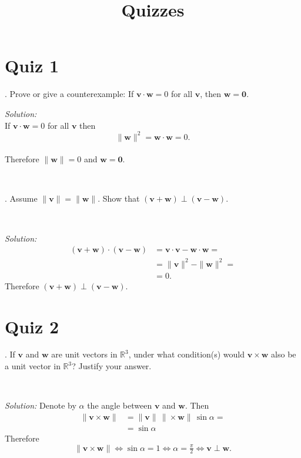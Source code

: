 \documentclass{article}
\def\RR{\mathbb{R}}%
\begin{document}
\title{Quizzes}
\author{}
\date{}
\maketitle

\section*{
Quiz 1
}

. Prove or give a counterexample: 
If $\mathbf{v}\cdot\mathbf{w} = 0$ for all $\mathbf{v}$, then
  $\mathbf{w} =\mathbf{0}$.
  
\noindent
\textit{Solution:}\\
If $\mathbf{v}\cdot\mathbf{w} = 0$ for all $\mathbf{v}$ then 
$$\|\mathbf{w}\|^2=\mathbf{w}\cdot\mathbf{w} = 0.$$\\ 
Therefore $\|\mathbf{w}\| = 0$ and $\mathbf{w}=\mathbf{0}$.

\ 

.
Assume $\|\mathbf{v}\|=\|\mathbf{w}\|$. 
Show that $(\mathbf{v}+\mathbf{w})\perp(\mathbf{v}-\mathbf{w})$.

\ 

\noindent
\textit{Solution:}\\
\begin{align*}
(\mathbf{v}+\mathbf{w})\cdot(\mathbf{v}-\mathbf{w})
&=\mathbf{v}\cdot\mathbf{v}-\mathbf{w}\cdot\mathbf{w}=
\\
&=\|\mathbf{v}\|^2-\|\mathbf{w}\|^2=
\\
&=0.
\end{align*}
Therefore $(\mathbf{v}+\mathbf{w})\perp(\mathbf{v}-\mathbf{w})$.

\section*{Quiz 2}

. If $\mathbf{v}$ and $\mathbf{w}$ are unit vectors in $\RR^3$, under what condition(s) would $\mathbf{v}\times\mathbf{w}$ also be a unit vector in $\RR^3$? 
Justify your answer.

\ 

\noindent
\textit{Solution:}
Denote by $\alpha$ the angle between $\mathbf{v}$ and $\mathbf{w}$. 
Then
\begin{align*}
\|\mathbf{v}\times\mathbf{w}\|&=\|\mathbf{v}\|\,\|\times\mathbf{w}\|\,\sin\alpha=
\\
&=\sin\alpha
\end{align*}Therefore 
\[\|\mathbf{v}\times\mathbf{w}\|\iff\sin\alpha=1\iff\alpha=\tfrac\pi2\iff\mathbf{v}\perp\mathbf{w}.\]
\end{document}
